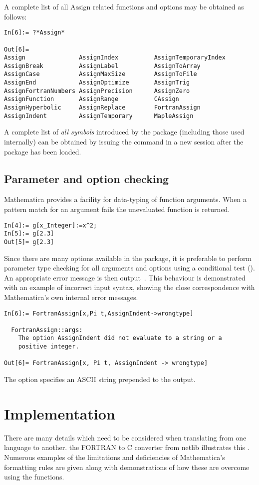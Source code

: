 \documentclass [12pt,twoside]{article}
\begin{document}
\pagebreak[2]
\noindent
A complete list of all Assign related functions and options may be
obtained as follows:
\begin{verbatim}
In[6]:= ?*Assign*

Out[6]=
Assign               AssignIndex          AssignTemporaryIndex
AssignBreak          AssignLabel          AssignToArray
AssignCase           AssignMaxSize        AssignToFile
AssignEnd            AssignOptimize       AssignTrig
AssignFortranNumbers AssignPrecision      AssignZero
AssignFunction       AssignRange          CAssign
AssignHyperbolic     AssignReplace        FortranAssign
AssignIndent         AssignTemporary      MapleAssign
\end{verbatim}
A complete list of {\em all symbols\/} introduced by the package
(including those used internally) can be obtained
by issuing the command  in a new session after the package has
been loaded.

\pagebreak[2]

\subsection{Parameter and option checking}

Mathematica provides a facility for data-typing of function arguments. When a
pattern match for an argument fails the unevaluated function is returned.
\begin{verbatim}
In[4]:= g[x_Integer]:=x^2;
In[5]:= g[2.3]
Out[5]= g[2.3]
\end{verbatim}
Since there are many options available in the package, it is preferable to
perform parameter type checking for all arguments and options using a conditional
test (\mma{/;}). An appropriate error message is then output~\cite{maedernotes}.
This behaviour is demonstrated with an example of incorrect input syntax,
showing the close correspondence with Mathematica's own internal error messages.
\begin{verbatim}
In[6]:= FortranAssign[x,Pi t,AssignIndent->wrongtype]

  FortranAssign::args: 
    The option AssignIndent did not evaluate to a string or a
    positive integer.

Out[6]= FortranAssign[x, Pi t, AssignIndent -> wrongtype]
\end{verbatim}
The option  specifies an ASCII string prepended to
the output.

\pagebreak[2]

\section{Implementation}\label{for_imp}
There are many details which need to be considered when translating from one
language to another.  the FORTRAN to C converter from netlib illustrates
this \cite{netlib}. Numerous examples of the limitations and deficiencies of
Mathematica's formatting rules are given along with demonstrations of how these
are overcome using the  functions.
\end{document}
